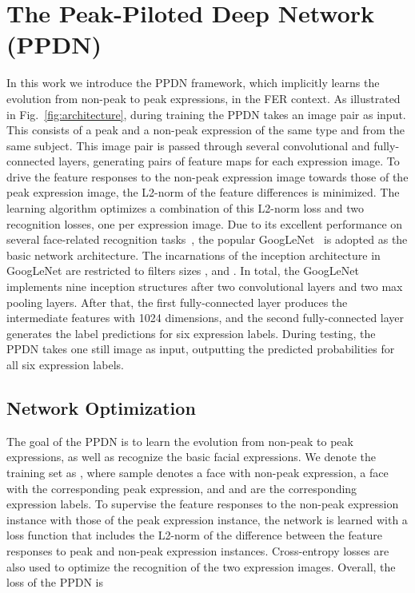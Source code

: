\documentclass[runningheads]{llncs}
\begin{document}
\section{The Peak-Piloted Deep Network (PPDN)}


In this work we introduce the PPDN framework, which implicitly learns 
the evolution from non-peak to peak expressions, in
the FER context. As illustrated in 
Fig.~\ref{fig:architecture}, during training the PPDN takes an image pair as 
input. This consists of a peak and a non-peak expression of the same 
type and from the same subject. This image pair is passed through several 
convolutional and fully-connected layers, generating pairs of feature 
maps for each expression image. To drive the feature responses to the 
non-peak expression image towards those of the peak expression image, the 
L2-norm of the feature differences is minimized. 
The learning algorithm optimizes a combination of this L2-norm loss
and two recognition losses, one per expression image. 
Due to its excellent performance on several face-related recognition 
tasks~\cite{schroff2015facenet,sun2015deepid3}, the popular 
GoogLeNet~\cite{szegedy2015going} is adopted as the basic 
network architecture. The incarnations of the inception architecture in 
GoogLeNet are restricted to filters sizes ,  and 
. In total, the GoogLeNet implements nine inception structures 
after two convolutional layers and two max pooling layers. After that, the 
first fully-connected layer produces the intermediate features with 1024 
dimensions, and the second fully-connected layer generates the label 
predictions for six expression labels. During testing, the PPDN takes one 
still image as input, outputting the predicted probabilities for all six 
expression labels. 




\subsection{Network Optimization}

The goal of the PPDN is to learn the evolution from non-peak 
to peak expressions, as well as recognize the basic facial expressions. 
We denote the training set as 
, where 
sample  denotes a face with non-peak expression,  a
face with the corresponding peak expression, and  and  are 
the corresponding expression labels. To supervise the feature responses
to the non-peak expression instance with those of the peak expression instance, 
the network is learned with a loss function that includes the L2-norm 
of the difference between the feature responses to peak and non-peak 
expression instances. Cross-entropy losses are also used to optimize the 
recognition of the two expression images. Overall, the loss of the PPDN is
\end{document}
